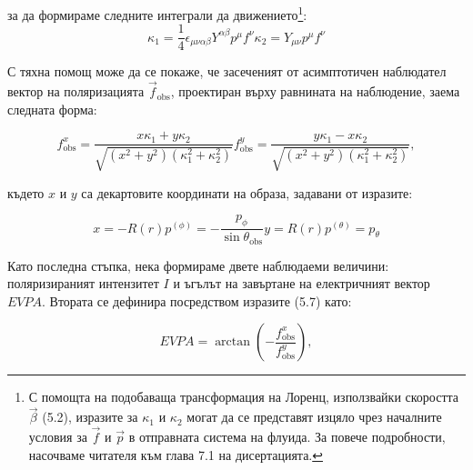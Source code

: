 \documentclass[12pt]{article}
\numberwithin{equation}{section}
\numberwithin{figure}{section}
\begin{document}
	\noindent за да формираме следните интеграли да движението\footnote{С помощта на подобаваща трансформация на Лоренц, използвайки скоростта $\vec{\beta}$ (5.2), изразите за $\kappa_1$ и $\kappa_2$ могат да се представят изцяло чрез началните условия за $\vec{f}$ и $\vec{p}$ в отправната система на флуида. За повече подробности, насочваме читателя към глава 7.1 на дисертацията.}:
	\begin{subequations}
		\begin{equation}
			\kappa_1 = \frac{1}{4}\epsilon_{\mu\nu\alpha\beta}Y^{\alpha\beta}p^\mu f^\nu
		\end{equation}
		\begin{equation}
			\kappa_2 = Y_{\mu\nu}p^\mu f^\nu
		\end{equation}
	\end{subequations}

	С тяхна помощ може да се покаже, че засеченият от асимптотичен наблюдател вектор на поляризацията $\vec{f}_\text{obs}$, проектиран върху равнината на наблюдение, заема следната форма:
	
	\begin{subequations}
		\begin{equation}
			f^x_\text{obs} = \frac{x\kappa_1 + y\kappa_2}{\sqrt{(x^2 + y^2)(\kappa_1^2 + \kappa_2^2)}}
		\end{equation}
		\begin{equation}
			f^y_\text{obs} = \frac{y \kappa_1 - x\kappa_2}{\sqrt{(x^2 + y^2)(\kappa_1^2 + \kappa_2^2)}},
		\end{equation}
	\end{subequations}
	
	където $x$ и $y$ са декартовите координати на образа, задавани от изразите:
	
	\begin{subequations}
		\begin{equation}
			x = -R(r)p^{(\phi)} = -\frac{p_\phi}{\sin\theta_\text{obs}}
		\end{equation}
		\begin{equation}
			y = R(r)p^{(\theta)} = p_\theta
		\end{equation}
	\end{subequations}
	
	Като последна стъпка, нека формираме двете наблюдаеми величини: поляризираният интензитет $I$ и ъгълът на завъртане на електричният вектор $EVPA$. Втората се дефинира посредством изразите (5.7) като:
	
	\begin{equation}
		EVPA = \arctan\left(-\frac{f^x_\text{obs}}{f^y_\text{obs}}\right),
	\end{equation}
	
\end{document}
